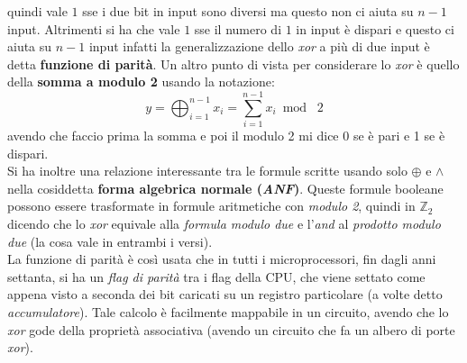 \documentclass[a4paper,12pt, oneside]{book}
\begin{document}
quindi vale $1$ sse i due bit in input sono diversi ma questo non ci aiuta su
$n-1$ input. Altrimenti si ha che vale $1$ sse il numero di $1$ in input è
dispari e questo ci aiuta su $n-1$ input infatti la generalizzazione dello
\textit{xor} a più di due input è detta \textbf{funzione di parità}. Un altro
punto di vista per considerare lo \textit{xor} è quello della \textbf{somma a
  modulo 2} usando la notazione:
\[y=\bigoplus_{i=1}^{n-1}x_i=\sum_{i=1}^{n-1}x_i\bmod\,\, 2\]
avendo che faccio prima la somma e poi il modulo 2 mi dice 0 se è pari e 1 se è
dispari. \\
Si ha inoltre una relazione interessante tra le formule scritte usando solo
$\oplus$ e $\land$ nella cosiddetta \textbf{forma algebrica normale
  (\textit{ANF})}. Queste formule booleane possono essere trasformate in formule
aritmetiche con \textit{modulo 2}, quindi in $\mathbb{Z}_2$ dicendo che lo
\textit{xor} equivale alla \textit{formula modulo due} e l'\textit{and} al
\textit{prodotto modulo due} (la cosa vale in entrambi i versi).\\
La funzione di parità è così usata che in tutti i microprocessori, fin dagli
anni settanta, si ha un \textit{flag di parità} tra i flag della CPU, che viene
settato come appena visto a seconda dei bit caricati su un registro particolare
(a volte detto \textit{accumulatore}). Tale calcolo è facilmente mappabile in
un circuito, avendo che lo \textit{xor} gode della proprietà associativa (avendo
un circuito che fa un albero di porte \textit{xor}).
\end{document}
